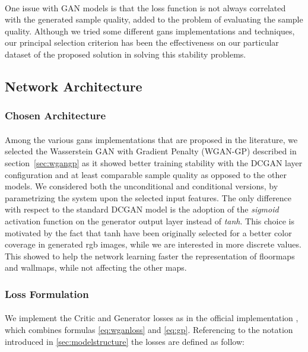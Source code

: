 \paragraph{} One issue with GAN models is that the loss function is not always correlated with the generated sample quality, added to the problem of evaluating the sample quality. Although we tried some different \glspl{gan} implementations and techniques, our principal selection criterion has been the effectiveness on our particular dataset of the proposed solution in solving this stability problems.

\subsection{Network Architecture}
\label{sec:networkarch}

\subsubsection{Chosen Architecture} 
\paragraph{} Among the various \glspl{gan} implementations that are proposed in the literature, we selected the Wasserstein GAN with Gradient Penalty \cite{wgangp} (WGAN-GP) described in section~\ref{sec:wgangp} as it showed better training stability with the DCGAN layer configuration and at least comparable sample quality as opposed to the other models. We considered both the unconditional and conditional versions, by parametrizing the system upon the selected input features. The only difference with respect to the standard DCGAN model is the adoption of the \textit{sigmoid} activation function on the generator output layer instead of \textit{tanh}. This choice is motivated by the fact that tanh have been originally selected for a better color coverage in generated rgb images, while we are interested in more discrete values. This showed to help the network learning faster the representation of \glspl{floormap} and \glspl{wallmap}, while not affecting the other maps.


\subsubsection{Loss Formulation}
\paragraph{} We implement the Critic and Generator losses as in the  official implementation \cite{wgangp-imple}, which combines formulas \ref{eq:wganloss} and \ref{eq:gp}. Referencing to the notation introduced in \ref{sec:modelstructure} the losses are defined as follow:

